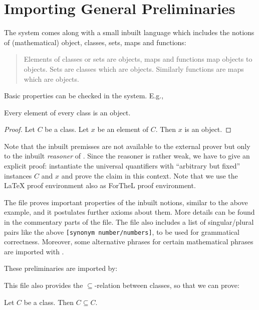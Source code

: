 \documentclass{stex}
\begin{document}
\section{Importing General Preliminaries}

The \Naproche{} system comes along with a small inbuilt language which
includes the notions of
(mathematical) object, classes, sets, maps and functions:
\begin{quotation}
Elements of classes or sets are objects, maps and functions map objects
to objects. Sets are classes which are objects.
Similarly functions are maps which are objects.
\end{quotation}
Basic properties can be checked in the system. E.g.,
\begin{greybox}
\begin{theorem} Every element of every class is an object. \end{theorem}
\begin{proof} Let $C$ be a class. Let $x$ be an element of $C$.
Then $x$ is an object.
\end{proof}
\end{greybox}

Note that the inbuilt premisses are not available to the external prover
but only to the inbuilt \textit{reasoner} of \Naproche. Since the reasoner is
rather weak, we have to give an explicit proof: instantiate the universal
quantifiers with ``arbitrary but fixed'' instances $C$ and $x$ and prove
the claim in this context. Note that we use the \LaTeX{} proof environment
also as ForTheL proof environment.

The file  proves important properties of the
inbuilt notions, similar to the above example, and it postulates further
axioms about them. More details can be found in the commentary parts of the file.
The file also includes a list  of singular/plural pairs
like the above
\verb+[synonym number/numbers]+, to be used for grammatical correctness.
Moreover, some alternative phrases for certain mathematical phrases are
imported with .

These preliminaries are imported by:
\begin{forthel}
\end{forthel}

This file also provides the $\subseteq$-relation between classes, so that
we can prove:
\begin{forthel}
\begin{theorem}
Let $C$ be a class. Then $C \subseteq C$.
\end{theorem}
\end{forthel}
\end{document}
